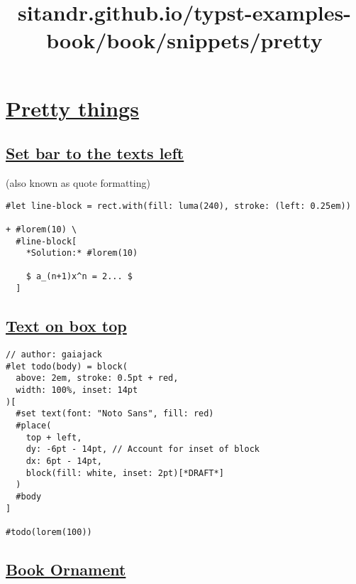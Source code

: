 \title{sitandr.github.io/typst-examples-book/book/snippets/pretty}

\section{\texorpdfstring{\hyperref[pretty-things]{Pretty
things}}{Pretty things}}\label{pretty-things}

\subsection{\texorpdfstring{\hyperref[set-bar-to-the-texts-left]{Set bar
to the text\textquotesingle s
left}}{Set bar to the text\textquotesingle s left}}\label{set-bar-to-the-texts-left}

(also known as quote formatting)

\begin{verbatim}
#let line-block = rect.with(fill: luma(240), stroke: (left: 0.25em))

+ #lorem(10) \
  #line-block[
    *Solution:* #lorem(10)

    $ a_(n+1)x^n = 2... $
  ]
\end{verbatim}

\pandocbounded{}

\subsection{\texorpdfstring{\hyperref[text-on-box-top]{Text on box
top}}{Text on box top}}\label{text-on-box-top}

\begin{verbatim}
// author: gaiajack
#let todo(body) = block(
  above: 2em, stroke: 0.5pt + red,
  width: 100%, inset: 14pt
)[
  #set text(font: "Noto Sans", fill: red)
  #place(
    top + left,
    dy: -6pt - 14pt, // Account for inset of block
    dx: 6pt - 14pt,
    block(fill: white, inset: 2pt)[*DRAFT*]
  )
  #body
]

#todo(lorem(100))
\end{verbatim}

\pandocbounded{}

\subsection{\texorpdfstring{\hyperref[book-ornament]{Book
Ornament}}{Book Ornament}}\label{book-ornament}

